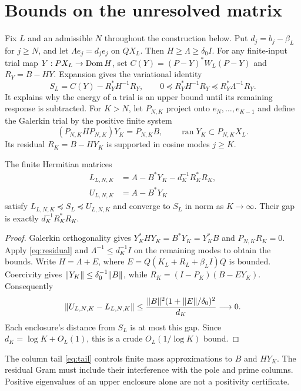 \section{Bounds on the unresolved matrix}
Fix $L$ and an admissible $N$ throughout the construction below.
Put $d_j=b_j-\beta_L$ for $j\ge N$, and let $\Lambda e_j=d_je_j$ on
$QX_L$. Then $H\ge\Lambda\ge\delta_0I$. For any finite-input trial map
$Y:PX_L\to\operatorname{Dom} H$, set $C(Y)=(P-Y)^*W_L(P-Y)$ and $R_Y=B-HY$.
Expansion gives the variational identity
\begin{equation}\label{eq:residual}
S_L=C(Y)-R_Y^*H^{-1}R_Y,\qquad
0\preceq R_Y^*H^{-1}R_Y\preceq R_Y^*\Lambda^{-1}R_Y.
\end{equation}
It explains why the energy of a trial is an upper bound until its
remaining response is subtracted.
For $K>N$, let $P_{N,K}$ project onto $e_N,\ldots,e_{K-1}$ and define
the Galerkin trial by the positive finite system
\[
(P_{N,K}HP_{N,K})Y_K=P_{N,K}B,\qquad
\operatorname{ran}Y_K\subset P_{N,K}X_L.
\]
Its residual $R_K=B-HY_K$ is supported in cosine modes $j\ge K$.
\begin{theorem}\label{thm:enclosure}
The finite Hermitian matrices
\begin{equation}\label{eq:lower-matrix}
\begin{aligned}
L_{L,N,K}&=A-B^*Y_K-d_K^{-1}R_K^*R_K,\\
U_{L,N,K}&=A-B^*Y_K
\end{aligned}
\end{equation}
satisfy $L_{L,N,K}\preceq S_L\preceq U_{L,N,K}$ and converge to $S_L$ in norm
as $K\to\infty$. Their gap is exactly $d_K^{-1}R_K^*R_K$.
\end{theorem}
\begin{proof}
Galerkin orthogonality gives
$Y_K^*HY_K=B^*Y_K=Y_K^*B$ and $P_{N,K}R_K=0$.
Apply \eqref{eq:residual} and
$\Lambda^{-1}\le d_K^{-1}I$ on the remaining modes to obtain the bounds.
Write $H=\Lambda+E$, where $E=Q(K_L+R_L+\beta_LI)Q$ is bounded.
Coercivity gives $\lVert Y_K\rVert\le\delta_0^{-1}\lVert B\rVert$, while
$R_K=(I-P_K)(B-EY_K)$. Consequently
\[
\lVert U_{L,N,K}-L_{L,N,K}\rVert
\le\frac{\lVert B\rVert^2(1+\lVert E\rVert/\delta_0)^2}{d_K}\longrightarrow0.
\]
Each enclosure's distance from $S_L$ is at most this gap.
Since $d_K=\log K+O_L(1)$, this is a crude $O_L(1/\log K)$ bound.
\end{proof}
The column tail \eqref{eq:tail} controls finite mass approximations to $B$
and $HY_K$. The residual Gram must include their interference with the
pole and prime columns. Positive eigenvalues of an upper enclosure alone
are not a positivity certificate.


